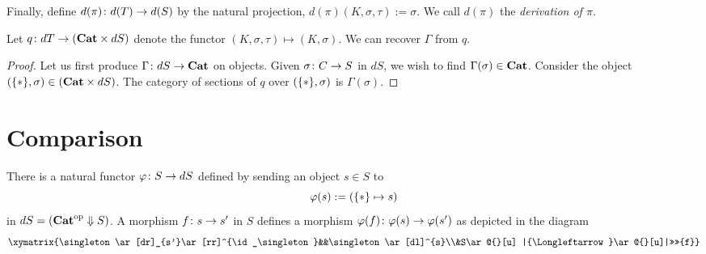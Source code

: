 \documentclass{amsart}
\makeatletter
\def\Down{\Downarrow}
\newcommand{\TriLeft}[7]{\xymatrix{#1\ar[dr]_{#2}\ar[rr]^{#3}&&#4\ar[dl]^{#5}\\&#6\ar@{}[u] |{\Longleftarrow}\ar@{}[u]|>>>>{#7}}}
\makeatother
\begin{document}
Finally, define $d(\pi)\colon d(T)\rightarrow d(S)$ by the natural projection, $d(\pi)(K,\sigma,\tau):=\sigma$.  We call $d(\pi)$ the {\em derivation of $\pi$}.

\begin{lemma}

Let $q\colon dT\rightarrow({\bf Cat}\times dS)$ denote the functor $(K,\sigma,\tau)\mapsto(K,\sigma)$.  We can recover $\Gamma$ from $q$.

\end{lemma}

\begin{proof}

Let us first produce $\Gamma\colon dS\rightarrow{\bf Cat}$ on objects.  Given $\sigma\colon C\rightarrow S$ in $dS$, we wish to find $\Gamma(\sigma)\in{\bf Cat}$.  Consider the object $({\{*\}},\sigma)\in({\bf Cat}\times dS)$.  The category of sections of $q$ over $({\{*\}},\sigma)$ is $\Gamma(\sigma)$.

\end{proof}


\section{Comparison}

There is a natural functor $\varphi\colon S\rightarrow dS$ defined by sending an object $s\in S$ to $$\varphi(s):=({\{*\}}\mapsto s)$$ in $dS=(\Cat\op\Down S)$.  A morphism $f\colon s\rightarrow s'$ in $S$ defines a morphism $\varphi(f)\colon\varphi(s)\rightarrow\varphi(s')$ as depicted in the diagram $$\TriLeft{\singleton}{s'}{\id_\singleton}{\singleton}{s}{S}{f}$$





\end{document}
